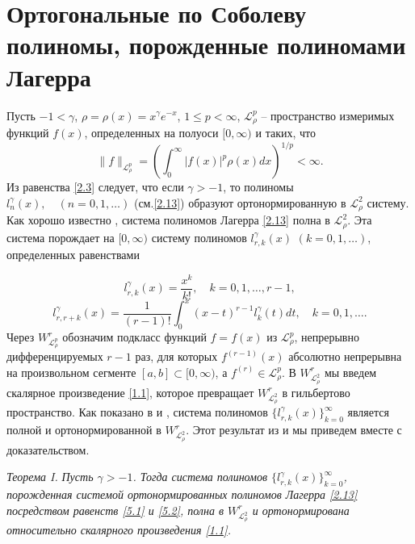 \section{Ортогональные по Соболеву полиномы, порожденные полиномами Лагерра}
Пусть $-1<\gamma$,  $\rho=\rho(x)=x^\gamma e^{-x}$, $1\le p<\infty $,  $\mathcal{ L}_{\rho}^p$ -- пространство измеримых функций $f(x)$, определенных на полуоси $[0,\infty)$ и таких, что
     $$
\|f\|_{\mathcal{ L}_{\rho}^p}=
\left(\int_0^\infty|f(x)|^p\rho(x)dx\right)^{1/p}<\infty.
    $$
Из равенства \eqref{2.3} следует, что если $\gamma>-1$, то полиномы $l_n^{\gamma}(x),\quad(n=0,1,\ldots)$ (см.\eqref{2.13})
образуют ортонормированную  в $\mathcal{ L}_\rho^2$  систему. Как хорошо известно \cite{Sege}, система полиномов Лагерра  \eqref{2.13} полна в $\mathcal{ L}_\rho^2$.   Эта система порождает на $[0,\infty)$ систему полиномов $l_{r,k}^{\gamma}(x)$ $(k=0,1,\ldots)$, определенных равенствами

  \begin{equation}\label{5.1}
l_{r,k}^{\gamma}(x) =\frac{x^k}{k!}, \quad k=0,1,\ldots, r-1,
\end{equation}
  \begin{equation}\label{5.2}
l_{r,r+k}^{\gamma}(x) =\frac{1}{(r-1)!}\int_{0}^x(x-t)^{r-1}l_{k}^{\gamma}(t)dt, \quad k=0,1,\ldots.
\end{equation}
 Через $W_{\mathcal{ L}_{\rho}^p}^r$ обозначим  подкласс функций $f=f(x)$ из $\mathcal{ L}_{\rho}^p$,
непрерывно дифференцируемых $r-1$ раз, для которых $f^{(r-1)}(x)$
абсолютно непрерывна на произвольном сегменте $[a,b]\subset[0,\infty)$,
а $f^{(r)}\in \mathcal{ L}_{\rho}^p$. В $W_{\mathcal{ L}_{\rho}^2}^r$ мы введем скалярное произведение \eqref{1.1}, которое превращает $W_{\mathcal{ L}_{\rho}^2}^r$ в гильбертово пространство.
Как  показано в  \cite{Shar11} и \cite{Shar12},  система полиномов $\{l_{r,k}^{\gamma}(x)\}_{k=0}^\infty$ является полной и ортонормированной в $W_{\mathcal{ L}_{\rho}^2}^r$. Этот результат из  \cite{Shar11} и \cite{Shar12} мы приведем вместе с доказательством.

\textit{ Теорема I.} \textit{
Пусть $\gamma>-1$. Тогда система полиномов $\{l_{r,k}^{\gamma}(x)\}_{k=0}^\infty$, порожденная системой ортонормированных полиномов Лагерра \eqref{2.13} посредством равенств \eqref{5.1} и \eqref{5.2}, полна  в $W^r_{\mathcal{ L}^2_\rho}$ и ортонормирована относительно скалярного произведения \eqref{1.1}.}

